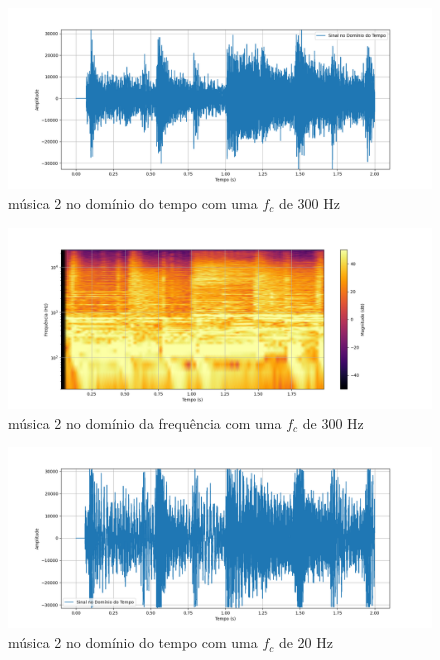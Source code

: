 \begin{anexosenv}
\begin{figure}[h]
	\centering
    \includegraphics[width=\textwidth]{figuras/fig36.png}
	\caption{música 2 no domínio do tempo com uma $f_c$ de 300 Hz}
	\label{fig36}
\end{figure}

\begin{figure}[h]
	\centering
    \includegraphics[width=\textwidth]{figuras/fig37.png}
	\caption{música 2 no domínio da frequência com uma $f_c$ de 300 Hz}
	\label{fig37}
\end{figure}

\begin{figure}[h]
	\centering
    \includegraphics[width=\textwidth]{figuras/fig38.png}
	\caption{música 2 no domínio do tempo com uma $f_c$ de 20 Hz}
	\label{fig38}
\end{figure}


\end{anexosenv}
